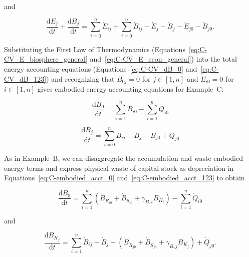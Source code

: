 \noindent and

\begin{equation} \label{eq:C-CV_dB_123}
	\frac{\mathrm{d}E_{j}}{\mathrm{d}t}
	+ \frac{\mathrm{d}B_{j}}{\mathrm{d}t} 	 
	= \sum\limits_{i=0}^{n} \dot{E}_{ij}
	+ \sum\limits_{i=0}^{n} \dot{B}_{ij}
	- \dot{E}_{j}
	- \dot{B}_{j}
	- \dot{E}_{j0}
	- \dot{B}_{j0}.
\end{equation}

Substituting the First Law of Thermodynamics 
(Equations~\ref{eq:C-CV_E_biosphere_general} and~\ref{eq:C-CV_E_econ_general}) 
into the total energy accounting equations 
(Equations~\ref{eq:C-CV_dB_0} and~\ref{eq:C-CV_dB_123}) 
and recognizing that $\dot{B}_{0j} = 0$ for $j \in [1, n]$
and $\dot{E}_{i0} = 0$ for $i \in [1, n]$
gives embodied energy accounting equations for Example~C: %

\begin{equation} \label{eq:C-embodied_acct_0}
	\frac{\mathrm{d}B_{0}}{\mathrm{d}t} 	 
	= \sum\limits_{i=1}^{n} \dot{B}_{i0}
	- \sum\limits_{i=1}^{n} \dot{Q}_{i0}
\end{equation}

\begin{equation} \label{eq:C-embodied_acct_123}
	\frac{\mathrm{d}B_{j}}{\mathrm{d}t} 	 
	= \sum\limits_{i=0}^{n} \dot{B}_{ij}
	- \dot{B}_{j}
	- \dot{B}_{j0}
	+ \dot{Q}_{j0} 
\end{equation}

As in Example~B, 
we can disaggregate the accumulation and waste embodied energy terms 
and express physical waste of capital stock as depreciation 
in Equations~\ref{eq:C-embodied_acct_0}
and~\ref{eq:C-embodied_acct_123}
to obtain

\begin{equation} \label{eq:C_embodied_energy_accounting_0_with_depreciation}
	\frac{\mathrm{d}B_{0}}{\mathrm{d}t} 
	= \sum\limits_{i=1}^n 
		\left( \dot{B}_{\dot{R}_{i0}} 
				+ \dot{B}_{\dot{S}_{i0}} 
				+ \gamma_{B,i} B_{K_{i}} \right)
	- \sum\limits_{i=1}^n\dot{Q}_{i0} 
\end{equation}

\noindent and

\begin{equation} \label{eq:C_embodied_energy_accounting_123_with_depreciation}
	\frac{\mathrm{d}B_{K_{j}}}{\mathrm{d}t} 
	= \sum\limits_{i=1}^n\dot{B}_{ij} 
	- \dot{B}_{j}
	- \left( \dot{B}_{\dot{R}_{j0}}
		+ \dot{B}_{\dot{S}_{j0}}
		+ \gamma_{B,j} B_{K_{j}} \right)
	+ \dot{Q}_{j0}.
\end{equation}

